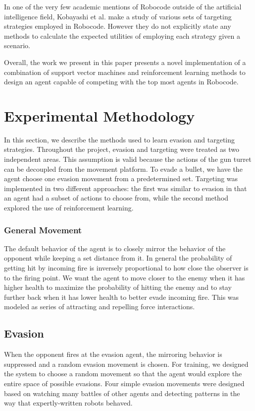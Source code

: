 \documentclass{article}
\theoremstyle{plain}
\theoremstyle{definition}
\theoremstyle{remark}
\begin{document}
In one of the very few academic mentions of Robocode outside of the artificial intelligence field, Kobayashi et al. make a study of various sets of targeting strategies employed in Robocode\cite{strategies}. However they do not explicitly state any methods to calculate the expected utilities of employing each strategy given a scenario.

Overall, the work we present in this paper presents a novel implementation of a combination of support vector machines and reinforcement learning methods to design an agent capable of competing with the top most agents in Robocode.

\section{Experimental Methodology}
In this section, we describe the methods used to learn evasion and targeting strategies. Throughout the project, evasion and targeting were treated as two independent areas. This assumption is valid because the actions of the gun turret can be decoupled from the movement platform. To evade a bullet, we have the agent choose one evasion movement from a predetermined set. Targeting was implemented in two different approaches: the first was similar to evasion in that an agent had a subset of actions to choose from, while the second method explored the use of reinforcement learning.

\subsubsection*{General Movement}
The default behavior of the agent is to closely mirror the behavior of the opponent while keeping a set distance from it. In general the probability of getting hit by incoming fire is inversely proportional to how close the observer is to the firing point. We want the agent to move closer to the enemy when it has higher health to maximize the probability of hitting the enemy and to stay further back when it has lower health to better evade incoming fire. This was modeled as series of attracting and repelling force interactions.

\subsection*{Evasion}
When the opponent fires at the evasion agent, the mirroring behavior is suppressed and a random evasion movement is chosen. For training, we designed the system to choose a random movement so that the agent would explore the entire space of possible evasions. Four simple evasion movements were designed based on watching many battles of other agents and detecting patterns in the way that expertly-written robots behaved.
\end{document}
